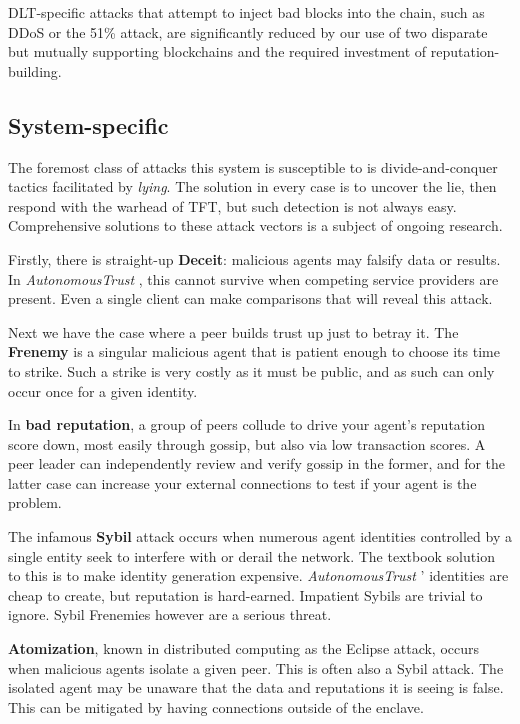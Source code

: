 \documentclass[10pt, twoside]{article}
\newcommand{\projectName}{\emph{AutonomousTrust }}
\begin{document}
DLT-specific attacks that attempt to inject bad blocks into the chain, such as DDoS or the 51\% attack, are significantly reduced by our use of two disparate but mutually supporting blockchains and the required investment of reputation-building.


\subsection{System-specific}

The foremost class of attacks this system is susceptible to is divide-and-conquer tactics facilitated by \textit{lying}. The solution in every case is to uncover the lie, then respond with the warhead of TFT, but such detection is not always easy. Comprehensive solutions to these attack vectors is a subject of ongoing research.

Firstly, there is straight-up \textbf{Deceit}: malicious agents may falsify data or results. In \projectName, this cannot survive when competing service providers are present. Even a single client can make comparisons that will reveal this attack.

Next we have the case where a peer builds trust up just to betray it. The \textbf{Frenemy} is a singular malicious agent that is patient enough to choose its time to strike. Such a strike is very costly as it must be public, and as such can only occur once for a given identity.

In \textbf{bad reputation}, a group of peers collude to drive your agent's reputation score down, most easily through gossip, but also via low transaction scores. A peer leader can independently review and verify gossip in the former, and for the latter case can increase your external connections to test if your agent is the problem.

The infamous \textbf{Sybil} attack occurs when numerous agent identities controlled by a single entity seek to interfere with or derail the network. The textbook solution to this is to make identity generation expensive. \projectName' identities are cheap to create, but reputation is hard-earned. Impatient Sybils are trivial to ignore. Sybil Frenemies however are a serious threat.

\textbf{Atomization}, known in distributed computing as the Eclipse attack, occurs when malicious agents isolate a given peer. This is often also a Sybil attack. The isolated agent may be unaware that the data and reputations it is seeing is false. This can be mitigated by having connections outside of the enclave.
\end{document}
